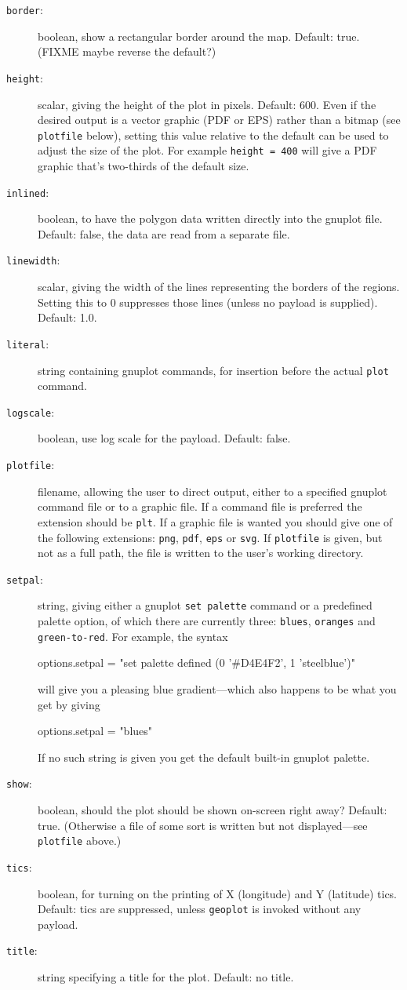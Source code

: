 \documentclass{article}
\begin{document}
\begin{description}
\item[\texttt{border}:] boolean, show a rectangular border around the
  map. Default: true. (FIXME maybe reverse the default?)
\item[\texttt{height}:] scalar, giving the height of the plot in
  pixels. Default: 600. Even if the desired output is a vector graphic
  (PDF or EPS) rather than a bitmap (see \texttt{plotfile} below),
  setting this value relative to the default can be used to adjust the
  size of the plot. For example \texttt{height = 400} will give a PDF
  graphic that's two-thirds of the default size.
\item[\texttt{inlined}:] boolean, to have the polygon data written
  directly into the \textsf{gnuplot} file. Default: false, the data
  are read from a separate file.
\item[\texttt{linewidth}:] scalar, giving the width of the lines
  representing the borders of the regions. Setting this to 0
  suppresses those lines (unless no payload is supplied). Default:
  1.0.
\item[\texttt{literal}:] string containing \textsf{gnuplot} commands,
  for insertion before the actual \texttt{plot} command.
\item[\texttt{logscale}:] boolean, use log scale for the
  payload. Default: false.
\item[\texttt{plotfile}:] filename, allowing the user to direct
  output, either to a specified \textsf{gnuplot} command file or to a
  graphic file. If a command file is preferred the extension should be
  \texttt{plt}. If a graphic file is wanted you should give one of the
  following extensions: \texttt{png}, \texttt{pdf}, \texttt{eps} or
  \texttt{svg}.  If \texttt{plotfile} is given, but not as a full
  path, the file is written to the user's working directory.
\item[\texttt{setpal}:] string, giving either a \textsf{gnuplot}
  \texttt{set palette} command or a predefined palette option, of
  which there are currently three: \texttt{blues}, \texttt{oranges}
  and \texttt{green-to-red}. For example, the syntax
  \begin{code}
    options.setpal = "set palette defined (0 '#D4E4F2', 1 'steelblue')"
  \end{code}
  will give you a pleasing blue gradient---which also happens to be
  what you get by giving
  \begin{code}
    options.setpal = "blues"
  \end{code}
  If no such string is given you get the default built-in
  \textsf{gnuplot} palette.
\item[\texttt{show}:] boolean, should the plot should be shown
  on-screen right away? Default: true. (Otherwise a file of some sort
  is written but not displayed---see \texttt{plotfile} above.)
\item[\texttt{tics}:] boolean, for turning on the printing of X
  (longitude) and Y (latitude) tics. Default: tics are suppressed,
  unless \texttt{geoplot} is invoked without any payload.
\item[\texttt{title}:] string specifying a title for the
  plot. Default: no title.
\end{description}
\end{document}
